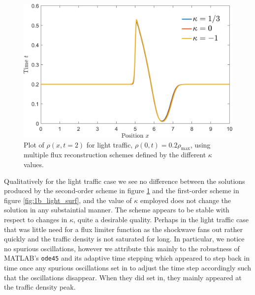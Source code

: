 \documentclass[11pt]{article}
\begin{document}
\begin{figure}[h!]
  \centering
  \includegraphics[width=\textwidth]{2a_light.png}
  \caption{Plot of $\rho(x,t=2)$ for light traffic, $\rho(0,t) = 0.2\rho_\mathrm{max}$, using multiple flux reconstruction schemes defined by the different $\kappa$ values.}
  \label{fig:2a_light}
\end{figure}

Qualitatively for the light traffic case we see no difference between the solutions produced by the second-order scheme in figure \ref{fig:2a_light} and the first-order scheme in figure \ref{fig:1b_light_surf}, and the value of $\kappa$ employed does not change the solution in any substaintial manner. The scheme appears to be stable with respect to changes in $\kappa$, quite a desirable quality. Perhaps in the light traffic case that was little need for a flux limiter function as the shockwave fans out rather quickly and the traffic density is not saturated for long. In particular, we notice no spurious oscillations, however we attribute this mainly to the robustness of MATLAB's \texttt{ode45} and its adaptive time stepping which appeared to step back in time once any spurious oscillations set in to adjust the time step accordingly such that the oscillations disappear. When they did set in, they mainly appeared at the traffic density peak.
\end{document}

